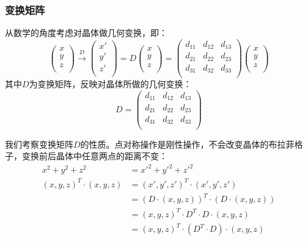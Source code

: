 \subsubsection{变换矩阵}
    从数学的角度考虑对晶体做几何变换，即：
    \[
    \left(
    \begin{array}{c}
        x \\
        y \\
        z \\
    \end{array}
    \right)
    \stackrel{D}{\longrightarrow}
    \left(
    \begin{array}{c}
        x' \\
        y' \\
        z' \\
    \end{array}
    \right)
    =
    D
    \left(
    \begin{array}{c}
        x \\
        y \\
        z \\
    \end{array}
    \right)
    =
    \left(
    \begin{array}{ccc}
        d_{11} & d_{12} & d_{13} \\
        d_{21} & d_{22} & d_{23} \\
        d_{31} & d_{32} & d_{33} \\
    \end{array}
    \right)
    \left(
    \begin{array}{c}
        x \\
        y \\
        z \\
    \end{array}
    \right)
    \]
    其中$D$为变换矩阵，反映对晶体所做的几何变换：
    \[
    D=
    \left(
    \begin{array}{ccc}
        d_{11} & d_{12} & d_{13} \\
        d_{21} & d_{22} & d_{23} \\
        d_{31} & d_{32} & d_{33} \\
    \end{array}
    \right)
    \]
    
    我们考察变换矩阵$D$的性质。点对称操作是刚性操作，不会改变晶体的布拉菲格子，变换前后晶体中任意两点的距离不变：
    \begin{align*}
        x^2+y^2+z^2 & = x'^2+y'^2+z'^2\\
        (x,y,z)^T \cdot (x,y,z) & = (x',y',z')^T \cdot (x',y',z')\\
         & = (D\cdot(x,y,z))^T \cdot (D\cdot(x,y,z))\\
         & = (x,y,z)^T \cdot D^T \cdot D \cdot (x,y,z)\\
         & = (x,y,z)^T \cdot (D^T \cdot D) \cdot (x,y,z)
    \end{align*}

